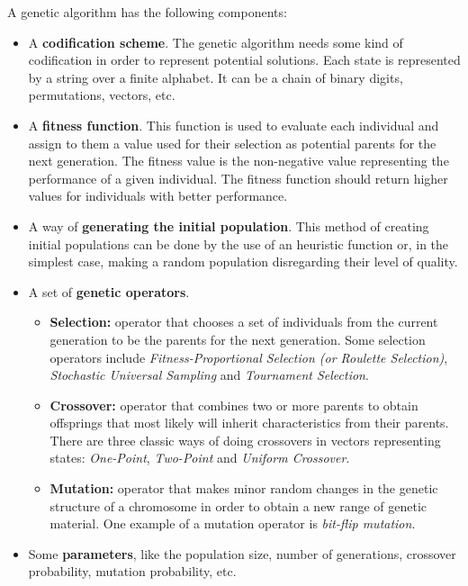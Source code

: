 \documentclass[]{llncs}
\begin{document}
A genetic algorithm has the following components:
\begin{itemize}
    \item A \textbf{codification scheme}. The genetic algorithm needs some kind of codification in order to represent potential solutions. Each state is represented by a string over a finite alphabet. It can be a chain of binary digits, permutations, vectors, etc. 
    \item A \textbf{fitness function}. This function is used to evaluate each individual and assign to them a value used for their selection as potential parents for the next generation. The fitness value is the non-negative value representing the performance of a given individual. The fitness function should return higher values for individuals with better performance.
    \item A way of \textbf{generating the initial population}. This method of creating initial populations can be done by the use of an heuristic function or, in the simplest case, making a random population disregarding their level of quality.
    \item A set of \textbf{genetic operators}. 
        \begin{itemize}
            \item \textbf{Selection:} operator that chooses a set of individuals from the current generation to be the parents for the next generation. Some selection operators include \textit{Fitness-Proportional Selection (or Roulette Selection)}, \textit{Stochastic Universal Sampling} and \textit{Tournament Selection}.
            \item \textbf{Crossover:} operator that combines two or more parents to obtain offsprings that most likely will inherit characteristics from their parents. There are three classic ways of doing crossovers in vectors representing states: \textit{One-Point}, \textit{Two-Point} and \textit{Uniform Crossover}.
            \item \textbf{Mutation:} operator that makes minor random changes in the genetic structure of a chromosome in order to obtain a new range of genetic material. One example of a mutation operator is \textit{bit-flip mutation}.
        \end{itemize}
    \item Some \textbf{parameters}, like the population size, number of generations, crossover probability, mutation probability, etc.
\end{itemize}
\end{document}
